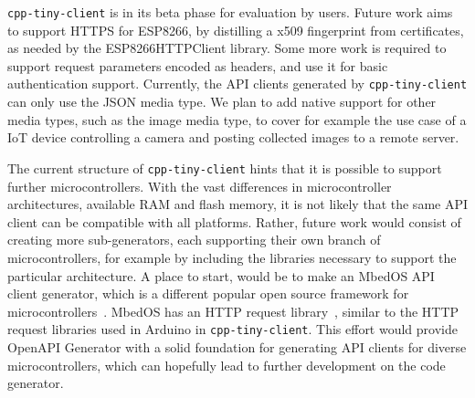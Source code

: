 \documentclass[manuscript,screen]{acmart}
\begin{document}
\begin{table}[t!]
\caption{Memory consumption overview}
\label{tab:memory_used}
\end{table}






\texttt{cpp-tiny-client} is in its beta phase for evaluation by users. 
Future work aims to support HTTPS for ESP8266, by distilling a x509 fingerprint from certificates, as needed by the ESP8266HTTPClient library. 
Some more work is required to support request parameters encoded as headers, and use it for basic authentication support. 
%
Currently, the API clients generated by \texttt{cpp-tiny-client} can only use the JSON media type. We plan to add native support for other media types, such as the image media type, to cover for example the use case of a IoT device controlling a camera and posting collected images to a remote server. 



The current structure of \texttt{cpp-tiny-client} hints that it is possible to support further microcontrollers. 
With the vast differences in microcontroller architectures, available RAM and flash memory, it is not likely that the same API client can be compatible with all platforms. Rather, future work would consist of creating more sub-generators, each supporting their own branch of microcontrollers, for example by including the libraries necessary to support the particular architecture. 
%
A place to start, would be to make an MbedOS API client generator, which is a different popular open source framework for microcontrollers~\cite{MbedOS}. MbedOS has an HTTP request library~\cite{MbedOSHTTPRequests}, similar to the HTTP request libraries used in Arduino in \texttt{cpp-tiny-client}. 
This effort would provide OpenAPI Generator with a solid foundation for generating API clients for diverse microcontrollers, which can hopefully lead to further development on the code generator. 
\end{document}
